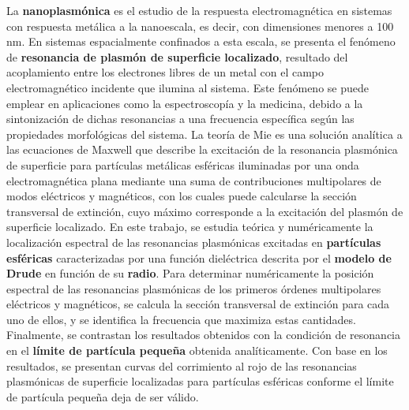 \documentclass[a0paper,portrait]{baposter}
\begin{document}
\begin{poster}
{\begin{singlespace}
				La {\color{mxpink}\textbf{nanoplasmónica}} es el estudio de la respuesta electromagnética en sistemas con respuesta metálica a la nanoescala, es decir, con dimensiones menores a 100 nm. En sistemas espacialmente confinados a esta escala, se presenta el fenómeno de {\color{mxpink}\textbf{resonancia de plasmón de superficie localizado}}, resultado del acoplamiento entre los electrones libres de un metal con el campo electromagnético incidente que ilumina al sistema. Este fenómeno se puede emplear en aplicaciones como la espectroscopía y la medicina, debido a la sintonización de dichas resonancias a una frecuencia específica según las propiedades morfológicas del sistema. La teoría de Mie es una solución analítica a las ecuaciones de Maxwell que describe la excitación de la resonancia plasmónica de superficie para partículas metálicas esféricas iluminadas por una onda electromagnética plana mediante una suma de contribuciones multipolares de modos eléctricos y magnéticos, con los cuales puede calcularse la sección transversal de extinción, cuyo máximo corresponde a la excitación del plasmón de superficie localizado. En este trabajo, se estudia teórica y numéricamente la localización espectral de las resonancias plasmónicas excitadas en {\color{mxpink}\textbf{partículas esféricas}} caracterizadas por una función dieléctrica descrita por el {\color{mxpink}\textbf{modelo de Drude}} en función de su {\color{mxpink}\textbf{radio}}. Para determinar numéricamente la posición espectral de las resonancias plasmónicas de los primeros órdenes multipolares eléctricos y magnéticos, se calcula la sección transversal de extinción para cada uno de ellos, y se identifica la frecuencia que maximiza estas cantidades. Finalmente, se contrastan los resultados obtenidos con la condición de resonancia en el {\color{mxpink}\textbf{límite de partícula pequeña}} obtenida analíticamente. Con base en los resultados, se presentan curvas del corrimiento al rojo de las resonancias plasmónicas de superficie localizadas para partículas esféricas conforme el límite de partícula pequeña deja de ser válido.
			\end{singlespace}
			
		}
		
		
		
\end{poster}
\end{document}
